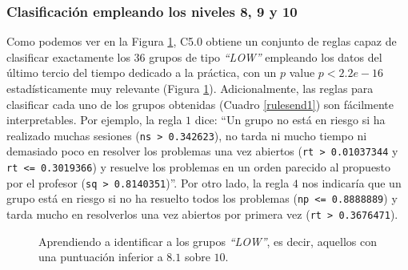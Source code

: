 \subsubsection{Clasificación empleando los niveles 8, 9 y 10}

Como podemos ver en la Figura \ref{fig:cmend1}, C5.0 obtiene un conjunto de reglas capaz de clasificar exactamente los $36$ grupos de tipo \emph{``LOW''} empleando los datos del último tercio del tiempo dedicado a la práctica, con un $p$ value $p < 2.2e-16$ estadísticamente muy relevante (Figura \ref{fig:cmend1}). Adicionalmente, las reglas para clasificar cada uno de los grupos obtenidas (Cuadro \ref{rulesend1}) son fácilmente interpretables. Por ejemplo, la regla $1$ dice: ``Un grupo no está en riesgo si ha realizado muchas sesiones (\texttt{ns > 0.342623}), no tarda ni mucho tiempo ni demasiado poco en resolver los problemas una vez abiertos (\texttt{rt > 0.01037344} y \texttt{rt <= 0.3019366}) y resuelve los problemas en un orden parecido al propuesto por el profesor (\texttt{sq > 0.8140351})''. Por otro lado, la regla $4$ nos indicaría que un grupo está en riesgo si no ha resuelto todos los problemas (\texttt{np <= 0.8888889}) y tarda mucho en resolverlos una vez abiertos por primera vez (\texttt{rt > 0.3676471}).

\begin{figure}[H]
\centering
{}
\caption{Aprendiendo a identificar a los grupos \emph{``LOW''}, es decir, aquellos con una puntuación inferior a $8.1$ sobre $10$.}
\label{fig:cmend1}
\end{figure}

